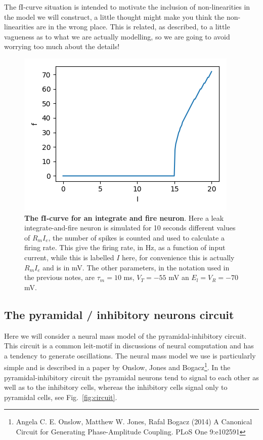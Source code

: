 \documentclass[11pt,a4paper]{scrartcl}
\begin{document}
The fI-curve situation is intended to motivate the inclusion of
non-linearities in the model we will construct, a little thought might
make you think the non-linearities are in the wrong place. This is
related, as described, to a little vagueness as to what we are
actually modelling, so we are going to avoid worrying too much about the details!

\begin{figure}
  \begin{center}
  \includegraphics{fIcurve.png}
  \end{center}
  \caption{\textbf{The fI-curve for an integrate and fire
      neuron}. Here a leak integrate-and-fire neuron is simulated for
    10 seconds different values of $R_mI_e$, the number of spikes is
    counted and used to calculate a firing rate. This give the firing
    rate, in Hz, as a function of input current, while this is
    labelled $I$ here, for convenience this is actually $R_mI_e$ and
    is in mV. The other parameters, in the notation used in the
    previous notes, are $\tau_m=10$ ms, $V_T=-55$ mV an $E_l=V_R=-70$
    mV.}
  \label{fig:fIcurve}
\end{figure}

\subsection*{The pyramidal / inhibitory neurons circuit}

Here we will consider a neural mass model of the pyramidal-inhibitory
circuit. This circuit is a common leit-motif in discussions of neural
computation and has a tendency to generate oscillations. The neural
mass model we use is particularly simple and is described in a paper
by Onslow, Jones and Bogacz\footnote{Angela C. E. Onslow, Matthew
W. Jones, Rafal Bogacz (2014) A Canonical Circuit for Generating
Phase-Amplitude Coupling. PLoS One 9:e102591}. In the
pyramidal-inhibitory circuit the pyramidal neurons tend to signal to
each other as well as to the inhibitory cells, whereas the inhibitory
cells signal only to pyramidal cells, see Fig.~\ref{fig:circuit}.
\end{document}
